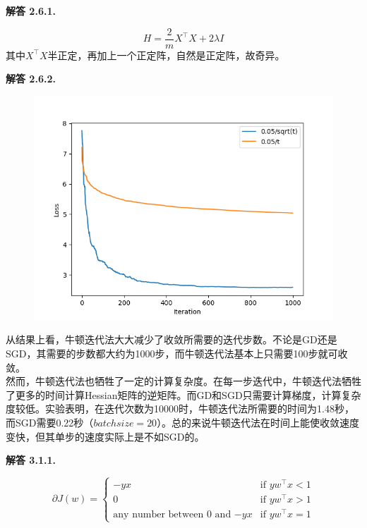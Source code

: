 \documentclass[12pt, a4paper, oneside]{ctexart}
\newenvironment{solution}[1]{\par\noindent\textbf{解答 #1. }\par}{\par}
\begin{document}
\begin{solution}{2.6.1}
    \begin{equation}
        H = \frac{2}{m} X^\top X + 2\lambda I \nonumber
    \end{equation}
    其中$X^\top X$半正定，再加上一个正定阵，自然是正定阵，故奇异。
\end{solution}

\begin{solution}{2.6.2}
    \begin{figure}[htbp]
        \centering
        \includegraphics[width=.7\textwidth]{pic/Figure_7.png}
    \end{figure}
    从结果上看，牛顿迭代法大大减少了收敛所需要的迭代步数。不论是GD还是SGD，其需要的步数都大约为1000步，而牛顿迭代法基本上只需要100步就可收敛。\\
    然而，牛顿迭代法也牺牲了一定的计算复杂度。在每一步迭代中，牛顿迭代法牺牲了更多的时间计算Hessian矩阵的逆矩阵。而GD和SGD只需要计算梯度，计算复杂度较低。实验表明，在迭代次数为10000时，牛顿迭代法所需要的时间为1.48秒，而SGD需要0.22秒（$batchsize=20$）。总的来说牛顿迭代法在时间上能使收敛速度变快，但其单步的速度实际上是不如SGD的。
\end{solution}

\begin{solution}{3.1.1}
    \begin{equation}
        \partial J(w) = 
        \begin{cases}
            -yx & \text{if $yw^\top x < 1$} \\
            0 & \text{if $yw^\top x > 1$} \\ 
            \text{any number between $0$ and $-yx$} & \text{if $yw^\top x = 1$}
        \end{cases} \nonumber
    \end{equation}
\end{solution}
\end{document}
